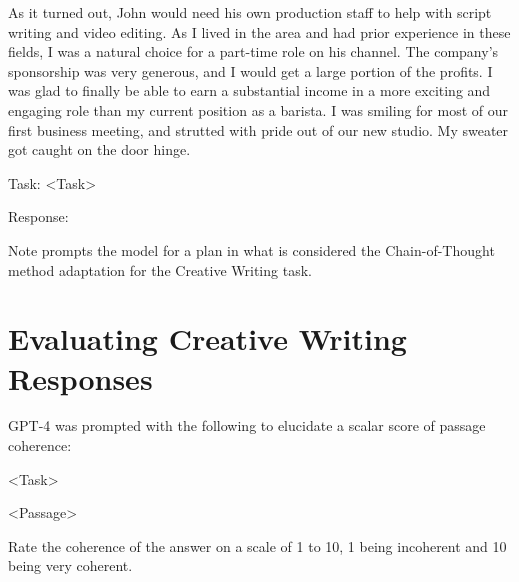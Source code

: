 \documentclass[11pt]{article}
\begin{document}
As it turned out, John would need his own production staff to help with script writing and video editing. As I lived in the area and had prior experience in these fields, I was a natural choice for a part-time role on his channel. The company's sponsorship was very generous, and I would get a large portion of the profits. I was glad to finally be able to earn a substantial income in a more exciting and engaging role than my current position as a barista. I was smiling for most of our first business meeting, and strutted with pride out of our new studio. My sweater got caught on the door hinge.

Task: <Task>

Response:

Note \citealp{yao_tree_2023} prompts the model for a plan in what is considered the Chain-of-Thought method adaptation for the Creative Writing task.

\section{Evaluating Creative Writing Responses}

GPT-4 was prompted with the following to elucidate a scalar score of passage coherence:

<Task>

<Passage>

Rate the coherence of the answer on a scale of 1 to 10, 1 being incoherent and 10 being very coherent.
\end{document}
